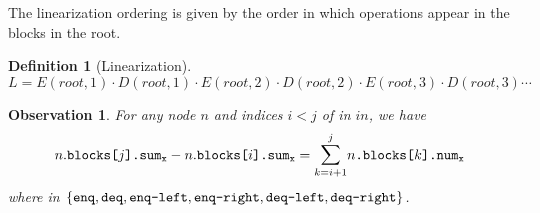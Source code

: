 \documentclass[10pt]{article}
\newcommand{\sub}[1]{\textsubscript{#1}}
\newcommand{\nf}[1]{{\normalfont{\texttt{#1}}}}
\newtheorem{observation}[theorem]{Observation}
\theoremstyle{definition}
\newtheorem{definition}[theorem]{Definition}
\begin{document}
The linearization ordering is given by the order in which operations appear in the blocks in the root.
\begin{definition}[Linearization] \label{def::lin}
 $$L=E(root,1)\cdot D(root,1)\cdot E(root,2)\cdot D(root,2)\cdot E(root,3)\cdot D(root,3)\cdots$$
\end{definition}

\begin{observation}\label{sumToNum}
For any node $n$ and indices $i<j$ of \nf{blocks} in $in$, we have
$$n.\nf{blocks[}j\nf{].sum\sub{x}}-n.\nf{blocks[}i\nf{].sum\sub{x}}=\mathlarger{\sum}_{k=i+1}^{j}  n\nf{.blocks[}k\nf{].num\sub{x}}$$ where \nf{x} in $\{\nf{enq}, \nf{deq}, \nf{enq-left}, \nf{enq-right}, \nf{deq-left}, \nf{deq-right}\}$.
\end{observation}
\end{document}
